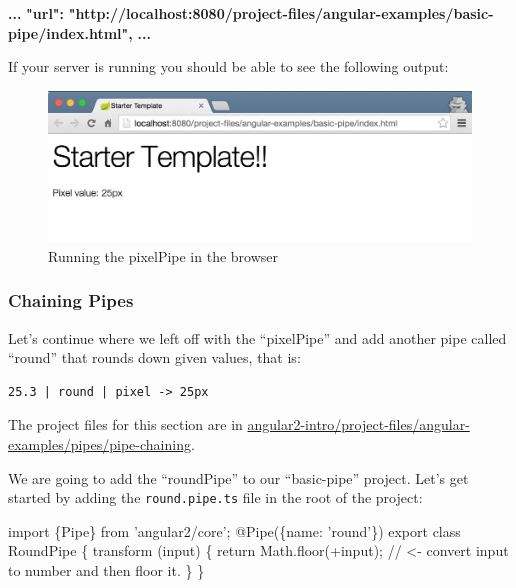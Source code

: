 \documentclass[12pt,]{article}
\newenvironment{Shaded}{}{}
\newcommand{\KeywordTok}[1]{\textcolor[rgb]{0.00,0.00,1.00}{{#1}}}
\newcommand{\CommentTok}[1]{\textcolor[rgb]{0.00,0.50,0.00}{{#1}}}
\newcommand{\FunctionTok}[1]{{#1}}
\newcommand{\ErrorTok}[1]{\textcolor[rgb]{1.00,0.00,0.00}{\textbf{{#1}}}}
\newcommand{\NormalTok}[1]{{#1}}
\begin{document}
\begin{Shaded}
\begin{Highlighting}[numbers=left,,]
\ErrorTok{...}
\ErrorTok{"url":} \ErrorTok{"http://localhost:8080/project-files/angular-examples/basic-pipe/index.html",}
\ErrorTok{...}
\end{Highlighting}
\end{Shaded}

If your server is running you should be able to see the following
output:

\begin{figure}[htbp]
\centering
\includegraphics{images/basic-pipe.png}
\caption{Running the pixelPipe in the browser}
\end{figure}

\subsubsection{Chaining Pipes}\label{chaining-pipes}

Let's continue where we left off with the ``pixelPipe'' and add another
pipe called ``round'' that rounds down given values, that is:

\begin{verbatim}
25.3 | round | pixel -> 25px
\end{verbatim}

The project files for this section are in
\href{https://github.com/st32lth/angular2-intro/tree/master/project-files/angular-examples/pipes/pipe-chaining}{angular2-intro/project-files/angular-examples/pipes/pipe-chaining}.

We are going to add the ``roundPipe'' to our ``basic-pipe'' project.
Let's get started by adding the \texttt{round.pipe.ts} file in the root
of the project:

\begin{Shaded}
\begin{Highlighting}[numbers=left,,]
\KeywordTok{import \{Pipe\} from 'angular2/core';}
\FunctionTok{@Pipe}\NormalTok{(\{name: 'round'\})}
\NormalTok{export }\KeywordTok{class} \NormalTok{RoundPipe \{}
  \FunctionTok{transform} \NormalTok{(input) \{}
    \KeywordTok{return} \NormalTok{Math.}\FunctionTok{floor}\NormalTok{(+input); }\CommentTok{// <- convert input to number and then floor it.}
  \NormalTok{\}}
\NormalTok{\}}
\end{Highlighting}
\end{Shaded}
\end{document}
